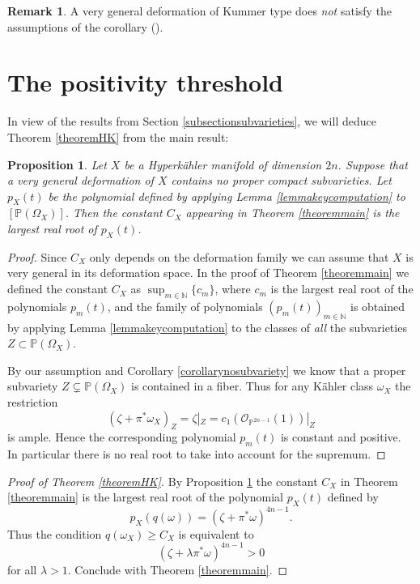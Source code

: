 \documentclass[11pt]{article}
\let\mathcal\mathscr
\theoremstyle{plain}
\newtheorem{proposition}[theorem]{Proposition}
\theoremstyle{definition}
\newtheorem{remark}[theorem]{Remark}
\newcommand{\N}{\ensuremath{\mathbb{N}}}
\newcommand{\PP}{\ensuremath{\mathbb{P}}}
\newcommand\sO{{\mathcal O}}
\begin{document}
\begin{remark} \label{remarknosubvarieties2}
A very general deformation of Kummer type
does {\em not} satisfy the assumptions of the corollary (\cite[\S 6.1]{KV98I}).
\end{remark}

\section{The positivity threshold}
\label{sectionpositivity}

In view of the results from Section \ref{subsectionsubvarieties}, we will deduce
Theorem \ref{theoremHK} from the main result:

\begin{proposition}\label{propositionsegre}
Let $X$ be a Hyperkähler manifold of dimension $2n$. Suppose that
a very general deformation of $X$ contains no proper compact subvarieties.
Let $p_X(t)$ be the polynomial defined by applying Lemma \ref{lemmakeycomputation}
to $[\PP(\Omega_X)]$.
Then the constant $C_X$ appearing in Theorem \ref{theoremmain}
is the largest real root of $p_X(t)$.
\end{proposition} 

\begin{proof}
Since $C_X$ only depends on the deformation family we can assume that $X$ is very general in its deformation space.
In the proof of Theorem \ref{theoremmain} we defined the constant $C_X$ as
$\sup_{m \in \N} \{ c_m \}$, where $c_m$ is the largest real root
of the polynomials $p_m(t)$,
and the family of polynomials $(p_m(t))_{m \in \N}$ is obtained by applying
Lemma \ref{lemmakeycomputation} to the classes of {\em all} the subvarieties $Z \subset \PP(\Omega_X)$.

By our assumption and Corollary \ref{corollarynosubvariety} we know that a proper subvariety $Z \subsetneq \PP(\Omega_X)$
is contained in a fiber. Thus for any Kähler class $\omega_X$ the restriction
\[
(\zeta+\pi^* \omega_X)_Z = \zeta|_Z = c_1(\sO_{\PP^{2n-1}}(1))|_Z
\]
is ample. Hence the corresponding polynomial $p_m(t)$ is constant and positive. In particular there is no real root to take into account for the supremum.
\end{proof}

\begin{proof}[Proof of Theorem \ref{theoremHK}]
By Proposition \ref{propositionsegre} the constant $C_X$ in Theorem \ref{theoremmain} is the largest real root
of the polynomial $p_X(t)$ defined by
\[
p_X(q(\omega)) = (\zeta + \pi^* \omega)^{4n-1}.
\]
Thus the condition $q(\omega_X) \geq C_X$ is equivalent to
\[
(\zeta + \lambda \pi^* \omega)^{4n-1} > 0
\]
for all $\lambda > 1$. Conclude with Theorem \ref{theoremmain}.
\end{proof}
\end{document}
